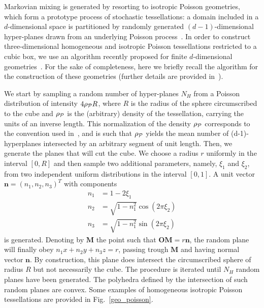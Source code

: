 \documentclass[final,authoryear,5p,times,twocolumn]{elsarticle}
\begin{document}
Markovian mixing is generated by resorting to isotropic Poisson geometries, which form a prototype process of stochastic tessellations: a domain included in a $d$-dimensional space is partitioned by randomly generated $(d-1)$-dimensional hyper-planes drawn from an underlying Poisson process~\cite{santalo}. In order to construct three-dimensional homogeneous and isotropic Poisson tessellations restricted to a cubic box, we use an algorithm recently proposed for finite $d$-dimensional geometries~\cite{serra, mikhailov}. For the sake of completeness, here we briefly recall the algorithm for the construction of these geometries (further details are provided in~\cite{larmier}).

We start by sampling a random number of hyper-planes $N_H$ from a Poisson distribution of intensity $4 \rho_{\cal P} R$, where $R$ is the radius of the sphere circumscribed to the cube and $\rho_{\cal P}$ is the (arbitrary) density of the tessellation, carrying the units of an inverse length. This normalization of the density $\rho_{\cal P}$ corresponds to the convention used in~\cite{santalo}, and is such that $\rho_{\cal P}$ yields the mean number of (d-1)-hyperplanes intersected by an arbitrary segment of unit length. Then, we generate the planes that will cut the cube. We choose a radius $r$ uniformly in the interval $[0,R]$ and then sample two additional parameters, namely, $\xi_1$ and $\xi_2$, from two independent uniform distributions in the interval $[0,1]$. A unit vector ${\mathbf n}=(n_1,n_2,n_3)^T$ with components
\begin{align}
n_1&=1-2\xi_1 \nonumber \\
n_2&=\sqrt{1-n_1^2}\cos{(2 \pi \xi_2)}\nonumber \\
n_3&=\sqrt{1-n_1^2}\sin{(2 \pi \xi_2)}\nonumber
\end{align}
is generated. Denoting by $\mathbf M$ the point such that ${\mathbf{ OM}}=r {\mathbf n}$, the random plane will finally obey $n_1 x + n_2 y +n_3 z =r$, passing trough $\mathbf M$ and having normal vector ${\mathbf n}$. By construction, this plane does intersect the circumscribed sphere of radius $R$ but not necessarily the cube. The procedure is iterated until $N_H$ random planes have been generated. The polyhedra defined by the intersection of such random planes are convex. Some examples of homogeneous isotropic Poisson tessellations are provided in Fig.~\ref{geo_poisson}. 
\end{document}
